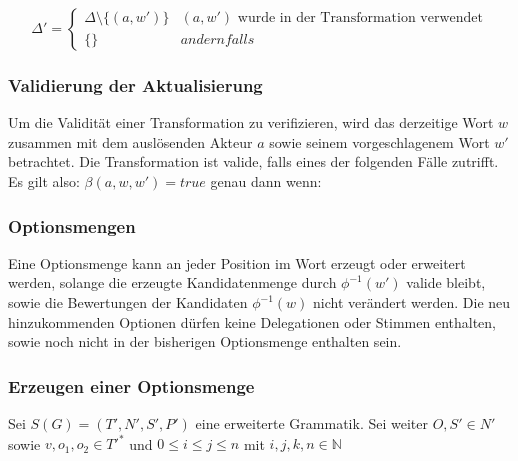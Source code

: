 \documentclass[]{article}
\begin{document}
\[ 
  \Delta' = 
  \begin{cases}
    \Delta\setminus \{ (a, w' )\} & (a,w')\text{ wurde in der Transformation verwendet} \\
    \{\} & andernfalls
  \end{cases}
\] 


\subsubsection*{Validierung der Aktualisierung}
Um die Validität einer Transformation zu verifizieren, wird das derzeitige Wort $w$ zusammen mit dem auslösenden Akteur $a$ sowie seinem vorgeschlagenem Wort $w'$ betrachtet. Die Transformation ist valide, falls eines der folgenden Fälle zutrifft.
Es gilt also: $\beta(a,w,w') = true$ genau dann wenn:

% 
% 
% 
% 




\subsubsection*{Optionsmengen}
Eine Optionsmenge kann an jeder Position im Wort erzeugt oder erweitert werden, solange die erzeugte Kandidatenmenge durch $\phi^{-1}(w')$ valide bleibt, sowie die Bewertungen der Kandidaten $\phi^{-1}(w)$ nicht verändert werden. Die neu hinzukommenden Optionen dürfen keine Delegationen oder Stimmen enthalten, sowie noch nicht in der bisherigen Optionsmenge enthalten sein.

\subsubsection*{Erzeugen einer Optionsmenge}

Sei $S(G) = (T', N', S', P')$ eine erweiterte Grammatik. Sei weiter $O,S'\in N'$ sowie $v,o_1,o_2 \in T'^*$ und $0\leq i\leq j\leq n$ mit $i,j,k,n \in \mathbb{N}$
\end{document}
